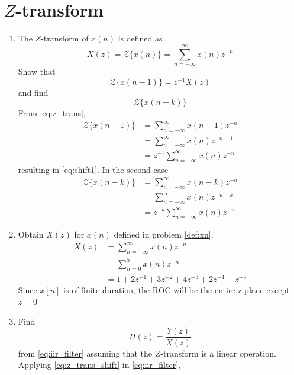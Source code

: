 \documentclass[journal,12pt,twocolumn]{IEEEtran}
\renewcommand\thesection{\arabic{section}}
\begin{document}
\section{$Z$-transform}
\begin{enumerate}[label=\thesection.\arabic*]
\item The $Z$-transform of $x(n)$ is defined as
%
\begin{equation}
\label{eq:z_trans}
X(z)={\mathcal {Z}}\{x(n)\}=\sum _{n=-\infty }^{\infty }x(n)z^{-n}
\end{equation}
%
Show that
\begin{equation}
\label{eq:shift1}
{\mathcal {Z}}\{x(n-1)\} = z^{-1}X(z)
\end{equation}
and find
\begin{equation}
	{\mathcal {Z}}\{x(n-k)\} 
\end{equation}
\solution From \eqref{eq:z_trans},
\begin{align}
{\mathcal {Z}}\{x(n-1)\} &=\sum _{n=-\infty }^{\infty }x(n-1)z^{-n}
\\
&=\sum _{n=-\infty }^{\infty }x(n)z^{-n-1} \\&= z^{-1}\sum _{n=-\infty }^{\infty }x(n)z^{-n}
\end{align}
resulting in \eqref{eq:shift1}. In the second case
%
\begin{align}
\label{eq:z_trans_shift}
\mathcal {Z}\{x(n-k)\} &=\sum _{n=-\infty }^{\infty }x(n-k)z^{-n}\\
&= \sum _{n=-\infty }^{\infty }x(n)z^{-n-k}\\
&= z^{-k}\sum_{n=-\infty}^{\infty}x(n)z^{-n}
\end{align}
\item Obtain $X(z)$ for $x(n)$ defined in problem 
	\ref{def:xn}.\\
\solution \begin{align}
    X(z) &= \sum_{n=-\infty}^{\infty}x(n)z^{-n}\\
    &= \sum_{n=0}^{5}x(n)z^{-n}\\
    &= 1 + 2z^{-1} + 3z^{-2} +4z^{-3} + 2z^{-4}+z^{-5}
\end{align}	
Since $x[n]$ is of finite duration, the ROC will be the entire z-plane except $z=0$
	\item Find
%
\begin{equation}
H(z) = \frac{Y(z)}{X(z)}
\end{equation}
%
from  \eqref{eq:iir_filter} assuming that the $Z$-transform is a linear operation.
\\
\solution  Applying \eqref{eq:z_trans_shift} in \eqref{eq:iir_filter},

\end{enumerate}
\end{document}
